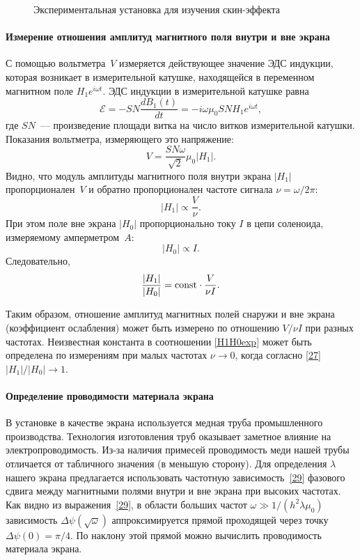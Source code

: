 \begin{figure}[h!]
    \centering
    \caption{Экспериментальная установка для изучения скин-эффекта}
\end{figure}
\paragraph{Измерение отношения амплитуд магнитного поля внутри и вне экрана}

С помощью вольтметра~$V$ измеряется действующее значение ЭДС индукции,
которая возникает в измерительной катушке, находящейся в переменном магнитном поле
$H_1e^{i\omega t}$.
ЭДС индукции в измерительной катушке равна
\[
\mathcal{E}=-SN\frac{dB_{1}(t)}{dt}=-i\omega \mu_0 S N H_1 e^{i\omega t},
\]
где $SN$~--- произведение площади витка на число витков измерительной катушки.
Показания вольтметра, измеряющего это напряжение:
\[
V= \frac{SN\omega}{\sqrt{2}}\mu_0|H_1|.
\]
Видно, что модуль амплитуды магнитного поля внутри экрана $|H_1|$ пропорционален~$V$
и обратно пропорционален частоте сигнала $\nu = \omega / 2\pi$:
\[
|H_1|\propto \frac{V}{\nu}.
\]
При этом поле вне экрана $|H_0|$ пропорционально току $I$ в цепи соленоида,
измеряемому амперметром~$A$:
\[
|H_0| \propto I.
\]
Следовательно,
\begin{equation} \eqmark{H1H0exp}
\frac{|H_1|}{|H_0|} = \const \cdot \frac{V}{\nu I}.
\end{equation}

Таким образом, отношение амплитуд магнитных полей снаружи и вне экрана
(коэффициент ослабления) может быть измерено
по отношению $V/\nu I$ при разных частотах. Неизвестная константа
в соотношении \eqref{H1H0exp} может быть определена по измерениям
при малых частотах $\nu \to 0$, когда согласно \eqref{27} $|H_1|/|H_0| \to 1$.


\paragraph{Определение проводимости материала экрана}

В установке в качестве экрана используется медная труба промышленного
производства. Технология изготовления труб оказывает заметное влияние
на электропроводимость. Из-за наличия примесей проводимость меди нашей
трубы отличается от табличного значения (в меньшую сторону).
Для определения $\lambda$ нашего экрана предлагается использовать
частотную зависимость~\eqref{29} фазового сдвига между магнитными полями
внутри и вне экрана при высоких частотах. Как видно из выражения~\eqref{29},
в области больших частот $\omega \gg 1/(h^2\lambda\mu_0)$ зависимость
$\Delta\psi(\sqrt{\omega})$ аппроксимируется прямой проходящей
через точку $\Delta\psi(0)=\pi/4$.
По наклону этой прямой можно вычислить проводимость материала экрана.

